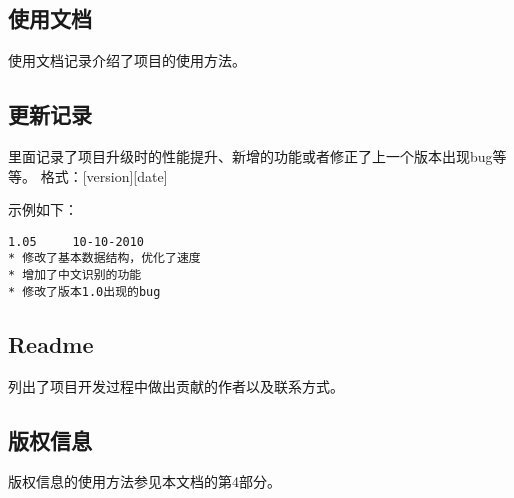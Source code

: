 \subsection{使用文档}

使用文档记录介绍了项目的使用方法。
\subsection{更新记录}

里面记录了项目升级时的性能提升、新增的功能或者修正了上一个版本出现bug等等。
格式：[version][date]

示例如下：
\begin{lstlisting}
1.05     10-10-2010
* 修改了基本数据结构，优化了速度
* 增加了中文识别的功能
* 修改了版本1.0出现的bug
\end{lstlisting}


\subsection{Readme}

列出了项目开发过程中做出贡献的作者以及联系方式。

\subsection{版权信息}

版权信息的使用方法参见本文档的第4部分。

